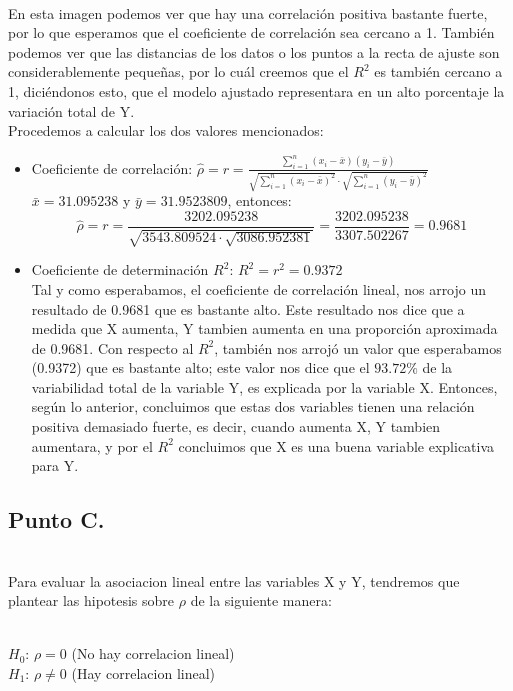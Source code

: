 \documentclass[letterpaper,12pt,onecolumn,titlepage]{article}
\begin{document}
~\\ En esta imagen podemos ver que hay una correlaci\'{o}n positiva bastante fuerte, por lo que esperamos que el coeficiente de correlaci\'{o}n sea cercano a 1. Tambi\'{e}n podemos ver que las distancias de los datos o los puntos a la recta de ajuste son considerablemente peque\~{n}as, por lo cu\'{a}l creemos que el $R^2$ es tambi\'{e}n cercano a 1, dici\'{e}ndonos esto, que el modelo ajustado representara en un alto porcentaje la variaci\'{o}n total de Y.
~\\ Procedemos a calcular los dos valores mencionados:
\begin{itemize}
\item Coeficiente de correlaci\'{o}n: $\hat{\rho}=r=\frac{\sum\limits_{i=1}^{n}(x_{i}-\bar{x})(y_{i}-\bar{y})}{\sqrt{\sum\limits_{i=1}^{n}(x_{i}-\bar{x})^2}\cdot\sqrt{\sum\limits_{i=1}^{n}(y_{i}-\bar{y})^2}}$
~\\ $\bar{x}=31.095238$ y $\bar{y}=31.9523809$, entonces:
~\\ $$\hat{\rho}=r=\frac{3202.095238}{\sqrt{3543.809524\cdot\sqrt{3086.952381}}}=\frac{3202.095238}{3307.502267}=0.9681$$
\item Coeficiente de determinaci\'{o}n $R^2$: $R^2=r^2=0.9372$
~\\ Tal y como esperabamos, el coeficiente de correlaci\'{o}n lineal, nos arrojo un resultado de 0.9681 que es bastante alto. Este resultado nos dice que a medida que X aumenta, Y tambien aumenta en una proporci\'{o}n aproximada de 0.9681. Con respecto al $R^2$, tambi\'{e}n nos arroj\'{o} un valor que esperabamos (0.9372) que es bastante alto; este valor nos dice que el $93.72\%$ de la variabilidad total de la variable Y, es explicada por la variable X.
Entonces, seg\'{u}n lo anterior, concluimos que estas dos variables tienen una relaci\'{o}n positiva demasiado fuerte, es decir, cuando aumenta X, Y tambien aumentara, y por el $R^2$ concluimos que X es una buena variable explicativa para Y.
\end{itemize} 
\subsection{Punto C.}
~\\ Para evaluar la asociacion lineal entre las variables X y Y, tendremos que plantear las hipotesis sobre $\rho$ de la siguiente manera:

~\\ $H_{0}$: $\rho=0$ (No hay correlacion lineal)
~\\ $H_{1}$: $\rho\neq 0$ (Hay correlacion lineal)
\end{document}
